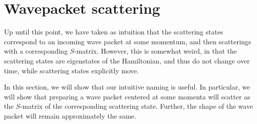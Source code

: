 \documentclass[../thesis-main/thesis-main]{subfiles}
\begin{document}
%
%


\section{Wavepacket scattering}\label{sec:SP_wavepacket_scattering}

Up until this point, we have taken as intuition that the scattering states correspond to an incoming wave packet at some momentum, and then scatterings with a corresponding $S$-matrix.  However, this is somewhat weird, in that the scattering states are eigenstates of the Hamiltonian, and thus do not change over time, while scattering states explicitly move.  

In this section, we will show that our intuitive naming is useful.  In particular, we will show that preparing a wave packet centered at some momenta will scatter as the $S$-matrix of the corresponding scattering state.  Further, the shape of the wave packet will remain approximately the same.
\end{document}
